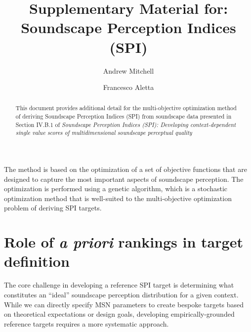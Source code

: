 \documentclass[
  authoryear,
  preprint,
  3p]{elsarticle}
\renewcommand*\contentsname{Table of contents}
\newcommand\contentsname{Table of contents}
\begin{document}
\begin{frontmatter}
\title{Supplementary Material for: Soundscape Perception Indices (SPI)}
\author[1]{Andrew Mitchell%
%
}
\author[1]{Francesco Aletta%
%
}




        
\begin{abstract}
This document provides additional detail for the multi-objective
optimization method of deriving Soundscape Perception Indices (SPI) from
soundscape data presented in Section IV.B.1 of \emph{Soundscape
Perception Indices (SPI): Developing context-dependent single value
scores of multidimensional soundscape perceptual quality}
\end{abstract}





\end{frontmatter}
    
\renewcommand*\contentsname{Table of contents}
{
\hypersetup{linkcolor=}
\setcounter{tocdepth}{3}
\tableofcontents
}

The method is based on the optimization of a set of objective functions
that are designed to capture the most important aspects of soundscape
perception. The optimization is performed using a genetic algorithm,
which is a stochastic optimization method that is well-suited to the
multi-objective optimization problem of deriving SPI targets.

\section{\texorpdfstring{Role of \emph{a priori} rankings in target
definition}{Role of a priori rankings in target definition}}\label{role-of-a-priori-rankings-in-target-definition}

The core challenge in developing a reference SPI target is determining
what constitutes an ``ideal'' soundscape perception distribution for a
given context. While we can directly specify MSN parameters to create
bespoke targets based on theoretical expectations or design goals,
developing empirically-grounded reference targets requires a more
systematic approach.
\end{document}
